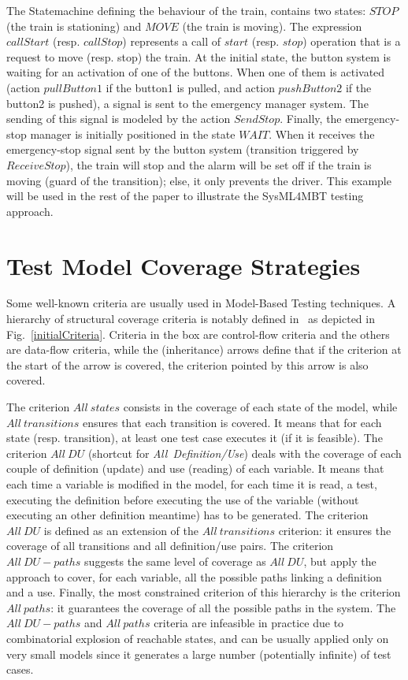 \documentclass{llncs}
\begin{document}
The Statemachine defining the behaviour of the train, contains two
states: $STOP$ (the train is stationing) and $MOVE$ (the train is
moving). The expression $callStart$ (resp. $callStop$) represents a
call of $start$ (resp. $stop$) operation that is a request to move
(resp. stop) the train.  
At the initial state, the button system is waiting for an activation
of one of the buttons. When one of them is activated (action
$pullButton1$ if the button1 is pulled, and action $pushButton2$ if
the button2 is pushed), a signal is sent to the emergency manager
system. The sending of this signal is modeled by the action $SendStop$.
Finally, the emergency-stop manager is initially positioned in the
state $WAIT$. When it receives the emergency-stop signal sent by the
button system (transition triggered by $ReceiveStop$), the train will
stop and the alarm will be set off if the train is moving (guard of
the transition); else, it only prevents the driver. 
This example will be used in the rest of the paper to
illustrate the SysML4MBT testing approach. 

\vspace*{-.25cm}
\section{Test Model Coverage Strategies}
\label{comCover}
\vspace*{-.25cm}
Some well-known criteria are usually used in Model-Based Testing
techniques. A hierarchy of structural coverage criteria is notably defined
in~\cite{FW88} as depicted in Fig.~\ref{initialCriteria}.  
Criteria in the box are control-flow criteria and the others are data-flow 
criteria, while the (inheritance) arrows define that if the criterion at the 
start of the arrow is covered, the criterion pointed by this arrow is also 
covered.

The criterion $All~states$ consists in the coverage of each state of
the model, while $All~transitions$ ensures that each transition is
covered. It means that for each state (resp. transition), at least one
test case executes it (if it is feasible). The criterion $All~DU$
(shortcut for {\it All~Definition/Use}) deals with the coverage of
each couple of definition (update) and use (reading) of each
variable. It means that each time a variable is modified in the model,
for each time it is read, a test, executing the definition before
executing the use of the variable (without executing an other
definition meantime) has to be generated. The criterion $All~DU$ is
defined as an extension of the $All~transitions$ criterion: it ensures
the coverage of all transitions and all definition/use pairs. The
criterion $All~DU-paths$ suggests the same level of coverage as
$All~DU$, but apply the approach to cover, for each variable, all the
possible paths linking a definition and a use. Finally, the most
constrained criterion of this hierarchy is the criterion $All~paths$:
it guarantees the coverage of all the possible paths in the
system. The $All~DU-paths$ and $All~paths$ criteria are infeasible in
practice due to combinatorial explosion of reachable states, and can
be usually applied only on very small models since it generates a
large number (potentially infinite) of test cases. 
\end{document}
